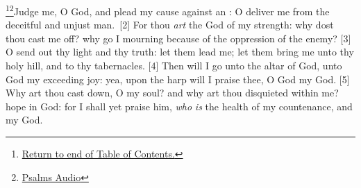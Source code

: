 
\footnote{\textcolor[cmyk]{0.99998,1,0,0}{\hyperlink{TOC}{Return to end of Table of Contents.}}}\footnote{\href{https://audiobible.com/bible/psalms_43.html}{\textcolor[cmyk]{0.99998,1,0,0}{Psalms Audio}}}\textcolor[cmyk]{0.99998,1,0,0}{Judge me, O God, and plead my cause against an : O deliver me from the deceitful and unjust man.}\
[2] \textcolor[cmyk]{0.99998,1,0,0}{For thou \emph{art} the God of my strength: why dost thou cast me off? why go I mourning because of the oppression of the enemy?}
[3] \textcolor[cmyk]{0.99998,1,0,0}{O send out thy light and thy truth: let them lead me; let them bring me unto thy holy hill, and to thy tabernacles.}
[4] \textcolor[cmyk]{0.99998,1,0,0}{Then will I go unto the altar of God, unto God my exceeding joy: yea, upon the harp will I praise thee, O God my God.}
[5] \textcolor[cmyk]{0.99998,1,0,0}{Why art thou cast down, O my soul? and why art thou disquieted within me? hope in God: for I shall yet praise him, \emph{who} \emph{is} the health of my countenance, and my God.}


